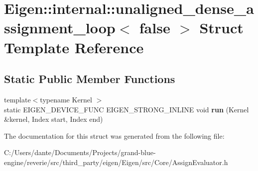 \hypertarget{struct_eigen_1_1internal_1_1unaligned__dense__assignment__loop_3_01false_01_4}{}\section{Eigen\+::internal\+::unaligned\+\_\+dense\+\_\+assignment\+\_\+loop$<$ false $>$ Struct Template Reference}
\label{struct_eigen_1_1internal_1_1unaligned__dense__assignment__loop_3_01false_01_4}
\subsection*{Static Public Member Functions}
\begin{DoxyCompactItemize}
\item 
\mbox{\label{struct_eigen_1_1internal_1_1unaligned__dense__assignment__loop_3_01false_01_4_a1a8b25a9d174f08fc57cb22dc5503f89}} 
{\footnotesize template$<$typename Kernel $>$ }\\static E\+I\+G\+E\+N\+\_\+\+D\+E\+V\+I\+C\+E\+\_\+\+F\+U\+NC E\+I\+G\+E\+N\+\_\+\+S\+T\+R\+O\+N\+G\+\_\+\+I\+N\+L\+I\+NE void {\bfseries run} (Kernel \&kernel, Index start, Index end)
\end{DoxyCompactItemize}


The documentation for this struct was generated from the following file\+:\begin{DoxyCompactItemize}
\item 
C\+:/\+Users/dante/\+Documents/\+Projects/grand-\/blue-\/engine/reverie/src/third\+\_\+party/eigen/\+Eigen/src/\+Core/Assign\+Evaluator.\+h\end{DoxyCompactItemize}
